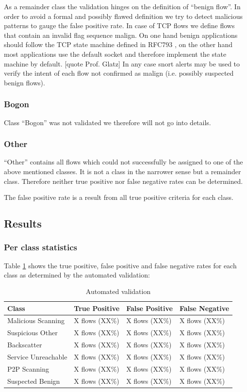 \documentclass[a4paper]{scrartcl}
\begin{document}
As a remainder class the validation hinges on the definition of ``benign flow''. 
In order to avoid a formal and possibly flawed definition we try to detect malicious patterns to gauge the false positive rate.
In case of TCP flows we define flows that contain an invalid flag sequence malign. On one hand benign applications should follow the TCP state machine defined in RFC793 \cite{rfc_tcp}, on the other hand most applications use the default socket and therefore implement the state machine by default. [quote Prof. Glatz]
In any case snort alerts may be used to verify the intent of each flow not confirmed as malign (i.e. possibly suspected benign flows).

\subsubsection{Bogon}
Class ``Bogon'' was not validated we therefore will not go into details.

\subsubsection{Other}
``Other'' contains all flows which could not successfully be assigned to one of the above mentioned classes. It is not a class in the narrower sense but a remainder class. Therefore neither true positive nor false negative rates can be determined.

The false positive rate is a result from all true positive criteria for each class.


\subsection{Results}
\subsubsection{Per class statistics}
Table \ref{stats_classes} shows the true positive, false positive and false negative rates for each class as determined by the automated validation:
\begin{table}[h]
\begin{tabularx}{\textwidth}{|X|X|X|X| }
	\cline{1-4} Class & True Positive & False Positive & False Negative \\
	\hline
	\hline Malicious Scanning  & X flows (XX\%) &  X flows (XX\%) &  X flows (XX\%) \\
	\hline Suspicious Other  & X flows (XX\%) & X flows (XX\%) & X flows (XX\%) \\
	\hline Backscatter  & X flows (XX\%) & X flows (XX\%) & X flows (XX\%) \\
	\hline
	\hline Service Unreachable  & X flows (XX\%) & X flows (XX\%) & X flows (XX\%) \\
	\hline P2P Scanning  & X flows (XX\%) & X flows (XX\%) & X flows (XX\%) \\
	\hline Suspected Benign  & X flows (XX\%) & X flows (XX\%) & X flows (XX\%) \\
	\hline
\end{tabularx}
	\caption{Automated validation}
	\label{stats_classes}
\end{table}
\end{document}
